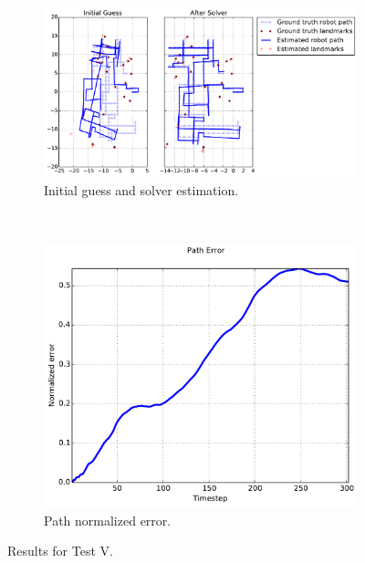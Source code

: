 {\begin{figure}[htbp!]
    \centering
    \begin{subfigure}[b]{\estWidth\textwidth}
        \includegraphics[width=\textwidth]{imagenes/tests/known/res_it_1_nl_40_op_1000_oa_1000_lp_1000_ds_300_kw_1.pdf}
        \caption{Initial guess and solver estimation.}
        \label{fig:test-va}
    \end{subfigure}\\
    \begin{subfigure}[b]{\errorWidth\textwidth}
        \includegraphics[width=\textwidth]{imagenes/tests/known/res_it_1_nl_40_op_1000_oa_1000_lp_1000_ds_300_kw_1_path.pdf}
        \caption{Path normalized error.}
        \label{fig:test-vb}
    \end{subfigure}
    \caption{Results for Test V.}
    \label{fig:test-v}
\end{figure}
}


